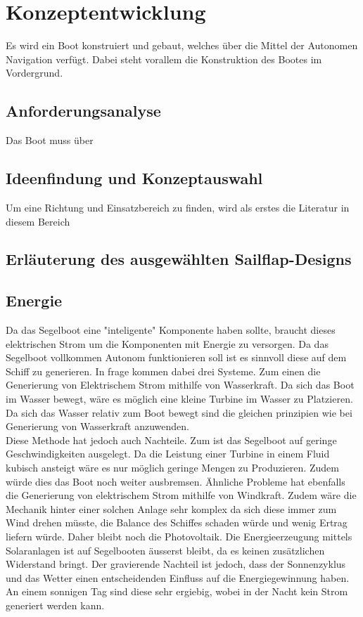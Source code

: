 
\chapter{Konzeptentwicklung }
\label{chap:konzeptentwicklung}


Es wird ein Boot konstruiert und gebaut, welches über die Mittel der Autonomen Navigation verfügt. Dabei steht vorallem die Konstruktion des Bootes im Vordergrund.

\section{Anforderungsanalyse}
Das Boot muss über 
\section{Ideenfindung und Konzeptauswahl}
Um eine Richtung und Einsatzbereich zu finden, wird als erstes die Literatur in diesem Bereich 
\section{Erläuterung des ausgewählten Sailflap-Designs}


\section{Energie}
Da das Segelboot eine "inteligente" Komponente haben sollte, braucht dieses elektrischen Strom um die Komponenten mit Energie zu versorgen. Da das Segelboot vollkommen Autonom funktionieren soll ist es sinnvoll diese auf dem Schiff zu generieren. In frage kommen dabei drei Systeme. Zum einen die Generierung von Elektrischem Strom mithilfe von Wasserkraft.
Da sich das Boot im Wasser bewegt, wäre es möglich eine kleine Turbine im Wasser zu Platzieren. Da sich das Wasser relativ zum Boot bewegt sind die gleichen prinzipien wie bei Generierung von Wasserkraft anzuwenden. \\
Diese Methode hat jedoch auch Nachteile. Zum ist das Segelboot auf geringe Geschwindigkeiten ausgelegt. Da die Leistung einer Turbine in einem Fluid kubisch ansteigt wäre es nur möglich geringe Mengen zu Produzieren. Zudem würde dies das Boot noch weiter ausbremsen. Ähnliche Probleme hat ebenfalls die Generierung von elektrischem Strom mithilfe von Windkraft. Zudem wäre die Mechanik hinter einer solchen Anlage sehr komplex da sich diese immer zum Wind drehen müsste, die Balance des Schiffes schaden würde und wenig Ertrag liefern würde.
Daher bleibt noch die Photovoltaik. Die Energieerzeugung mittels Solaranlagen ist auf Segelbooten äusserst bleibt, da es keinen zusätzlichen Widerstand bringt. Der gravierende Nachteil ist jedoch, dass der Sonnenzyklus und das Wetter einen entscheidenden Einfluss auf die Energiegewinnung haben. An einem sonnigen Tag sind diese sehr ergiebig, wobei in der Nacht kein Strom generiert werden kann.




